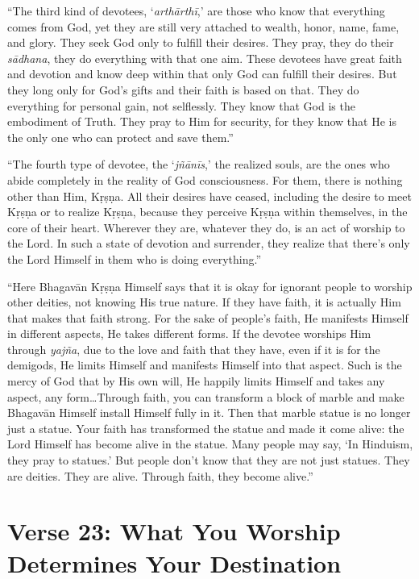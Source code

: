 \enquote{The third kind of devotees, \enquote{\textit{arthārthī},} are those who know that everything comes from God, yet they are still very attached to wealth, honor, name, fame, and glory. They seek God only to fulfill their desires. They pray, they do their \textit{sādhana}, they do everything with that one aim. These devotees have great faith and devotion and know deep within that only God can fulfill their desires. But they long only for God’s gifts and their faith is based on that. They do everything for personal gain, not selflessly. They know that God is the embodiment of Truth. They pray to Him for security, for they know that He is the only one who can protect and save them.}

\enquote{The fourth type of devotee, the \enquote{\textit{jñānīs},} the realized souls, are the ones who abide completely in the reality of God consciousness. For them, there is nothing other than Him, Kṛṣṇa. All their desires have ceased, including the desire to meet Kṛṣṇa or to realize Kṛṣṇa, because they perceive Kṛṣṇa within themselves, in the core of their heart. Wherever they are, whatever they do, is an act of worship to the Lord. In such a state of devotion and surrender, they realize that there’s only the Lord Himself in them who is doing everything.}

\enquote{Here Bhagavān Kṛṣṇa Himself says that it is okay for ignorant people to worship other deities, not knowing His true nature. If they have faith, it is actually Him that makes that faith strong. For the sake of people’s faith, He manifests Himself in different aspects, He takes different forms. If the devotee worships Him through \textit{yajña}, due to the love and faith that they have, even if it is for the demigods, He limits Himself and manifests Himself into that aspect. Such is the mercy of God that by His own will, He happily limits Himself and takes any aspect, any form\ldots Through faith, you can transform a block of marble and make Bhagavān Himself install Himself fully in it. Then that marble statue is no longer just a statue. Your faith has transformed the statue and made it come alive: the Lord Himself has become alive in the statue. Many people may say, \enquote{In Hinduism, they pray to statues.} But people don’t know that they are not just statues. They are deities. They are alive. Through faith, they become alive.}

\section{Verse 23: What You Worship Determines Your Destination}\label{sec-verse-23-what-you-worship-determines-your-destination}



